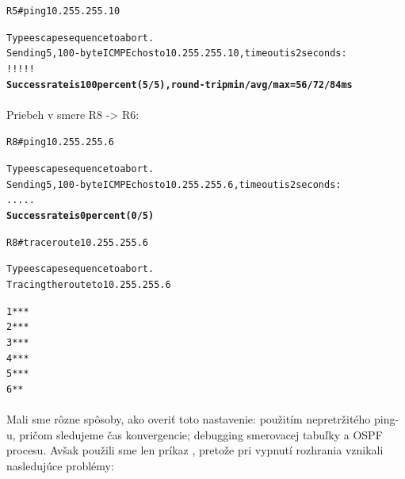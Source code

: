 \documentclass[12pt,twoside,a4paper]{report}
\begin{document}
\noindent
{\selectfont
\begin{small}
\begin{alltt}

R5#ping 10.255.255.10

Type escape sequence to abort.
Sending 5, 100-byte ICMP Echos to 10.255.255.10, timeout is 2 seconds:
!!!!!
\textbf{Success rate is 100 percent (5/5), round-trip min/avg/max = 56/72/84 ms}

\end{alltt}
\end{small}
}


\paragraph{}
Priebeh  v smere R8 -\textgreater{} R6:

\noindent
{\selectfont
\begin{small}
\begin{alltt}

R8#ping 10.255.255.6

Type escape sequence to abort.
Sending 5, 100-byte ICMP Echos to 10.255.255.6, timeout is 2 seconds:
.....
\textbf{Success rate is 0 percent (0/5)}





R8#traceroute 10.255.255.6

Type escape sequence to abort.
Tracing the route to 10.255.255.6

  1  *  *  * 
  2  *  *  * 
  3  *  *  * 
  4  *  *  * 
  5  *  *  * 
  6  *  * 

\end{alltt}
\end{small}
}

\paragraph{}
Mali sme rôzne spôsoby, ako overiť toto nastavenie: použitím nepretržitého ping-u, pričom sledujeme čas konvergencie; debugging smerovacej tabuľky a OSPF procesu. Avšak použili sme len príkaz , pretože pri vypnutí rozhrania  vznikali nasledujúce problémy:
\end{document}
